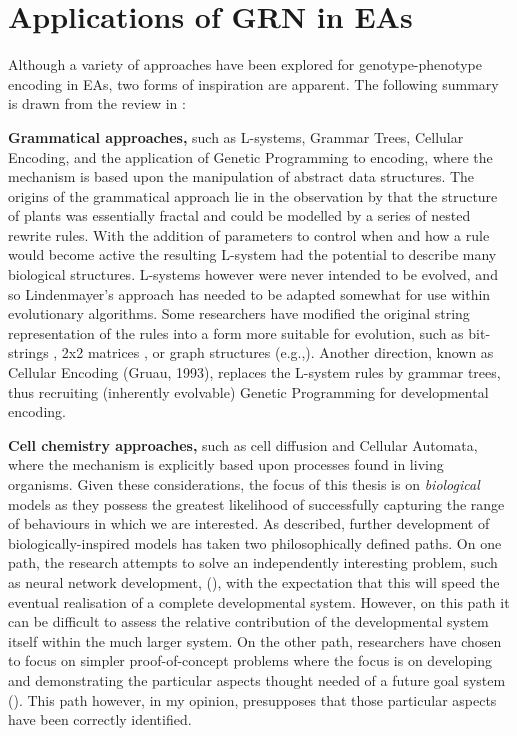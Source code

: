 \chapter{Applications of GRN in EAs}\label{applications-of-grn-in-eas}

Although a variety of approaches have been explored for genotype-phenotype encoding in EAs, two forms of inspiration are apparent. The following summary is drawn from the review in \textcite{Stanley:2003fh}:

\textbf{Grammatical approaches,} such as L-systems, Grammar Trees, Cellular Encoding, and the application of Genetic Programming to encoding, where the mechanism is based upon the manipulation of abstract data structures. The origins of the grammatical approach lie in the observation by \textcite{Lindenmayer:1968nl} that the structure of plants was essentially fractal and could be modelled by a series of nested rewrite rules. With the addition of parameters to control when and how a rule would become active the resulting L-system had the potential to describe many biological structures. L-systems however were never intended to be evolved, and so Lindenmayer's approach has needed to be adapted somewhat for use within evolutionary algorithms. Some researchers have modified the original string representation of the rules into a form more suitable for evolution, such as bit-strings \parencite{Boers:1992cn}, 2x2 matrices \parencite{Kitano:1990fs}, or graph structures (e.g.,\cite{Sims:1994uq}). Another direction, known as Cellular Encoding (Gruau, 1993), replaces the L-system rules by grammar trees, thus recruiting (inherently evolvable) Genetic Programming for developmental encoding.

\textbf{Cell chemistry approaches,} such as cell diffusion and Cellular Automata, where the mechanism is explicitly based upon processes found in living organisms. Given these considerations, the focus of this thesis is on \emph{biological} models as they possess the greatest likelihood of successfully capturing the range of behaviours in which we are interested. As \textcite{Stanley:2003fh} described, further development of biologically-inspired models has taken two philosophically defined paths. On one path, the research attempts to solve an independently interesting problem, such as neural network development, (\eg \cite{Bongard:2003tf}), with the expectation that this will speed the eventual realisation of a complete developmental system. However, on this path it can be difficult to assess the relative contribution of the developmental system itself within the much larger system. On the other path, researchers have chosen to focus on simpler proof-of-concept problems where the focus is on developing and demonstrating the particular aspects thought needed of a future goal system (\eg \cite{Bentley:1999zr,Roggen:2007kl}). This path however, in my opinion, presupposes that those particular aspects have been correctly identified.


